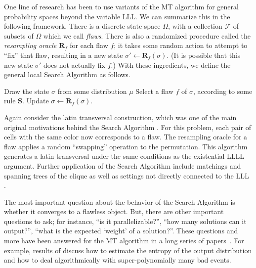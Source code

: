 \documentclass[11pt]{article}
\begin{document}
One line of research has been to use variants of the MT algorithm for general probability spaces beyond the variable LLL. We can summarize this in the following framework.
%
%
There is a discrete state space $\Omega$, with a collection $\mathcal{F}$ of subsets  of $\Omega$ which we call
%
\emph{flaws}.  %
There is also a randomized procedure called the \emph{resampling oracle} $\mathbf R_f$ for each flaw $f$; it takes some random action to attempt to ``fix'' that flaw, resulting in a new state $\sigma' \leftarrow \mathbf R_f(\sigma)$. (It is possible that this new state $\sigma'$ does not actually fix $f$.) With these ingredients, we define the general local Search Algorithm as follows. %
%

\begin{algorithm}[H]
\centering
\begin{algorithmic}[1]
  \State Draw the state $\sigma$ from some distribution $\mu$
\State Select a flaw $f$ of $\sigma$, according to some rule $\mathbf S$.
\State Update $\sigma \leftarrow  \mathbf R_f(\sigma)$.
\EndWhile
\end{algorithmic}
\caption{The Search Algorithm}
\label{ls-alg}
\end{algorithm}

Again consider the latin transversal construction, which was one of the main original motivations behind the  Search Algorithm \cite{PermHarris}. For this problem, each pair of cells with the same color now corresponds to a flaw. The resampling oracle for a flaw applies a random ``swapping'' operation  to the permutation. This algorithm generates a latin transversal under the same conditions as the existential LLLL argument.  Further application of the Search Algorithm include matchings and spanning trees of the clique  \cite{AIJACM, AIK,PermHarris,IS,HV} as well as settings not directly connected to the LLL \cite{AIS,PartResmp2,PartResmp1}.
 
The most important question about the behavior of the Search Algorithm is whether it converges to a flawless object. But, there are other important questions to ask; for instance, ``is it parallelizable?'', ``how many solutions can it output?'', ``what is the expected  `weight' of a solution?''. These questions and more have been answered for the MT algorithm in a long series of papers~\cite{determ,distributed,ParallelHarrisHaeupler,Haeupler_jacm,ParallelHarris,EnuHarris,szege_meet,MT}. 
For example,  results of \cite{Haeupler_jacm,NewBoundsHarris,EnuHarris} discuss how to estimate the entropy of the output distribution and how to deal algorithmically with super-polynomially many bad events.
\end{document}
